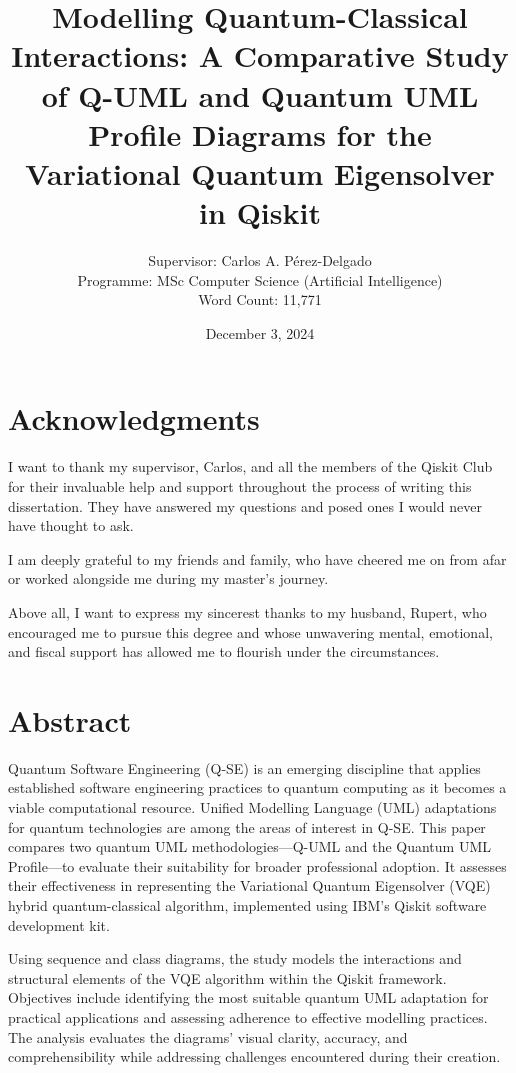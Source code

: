 \documentclass{article}
\title{Modelling Quantum-Classical Interactions: A Comparative Study of Q-UML and Quantum UML Profile Diagrams for the Variational Quantum Eigensolver in Qiskit}
\author{Supervisor: Carlos A. Pérez-Delgado\\ Programme: MSc Computer Science (Artificial Intelligence) \\ Word Count: 11,771}
\date{December 3, 2024}
\begin{document}
\maketitle

\thispagestyle{empty} %

\newpage
\setcounter{page}{1}

\section*{Acknowledgments}

I want to thank my supervisor, Carlos, and all the members of the Qiskit Club for their invaluable help and support throughout the process of writing this dissertation. They have answered my questions and posed ones I would never have thought to ask.

I am deeply grateful to my friends and family, who have cheered me on from afar or worked alongside me during my master’s journey.

Above all, I want to express my sincerest thanks to my husband, Rupert, who encouraged me to pursue this degree and whose unwavering mental, emotional, and fiscal support has allowed me to flourish under the circumstances.

\newpage

\section*{Abstract}

Quantum Software Engineering (Q-SE) is an emerging discipline that applies established software engineering practices to quantum computing as it becomes a viable computational resource. Unified Modelling Language (UML) adaptations for quantum technologies are among the areas of interest in Q-SE. This paper compares two quantum UML methodologies—Q-UML and the Quantum UML Profile—to evaluate their suitability for broader professional adoption. It assesses their effectiveness in representing the Variational Quantum Eigensolver (VQE) hybrid quantum-classical algorithm, implemented using IBM’s Qiskit software development kit.

Using sequence and class diagrams, the study models the interactions and structural elements of the VQE algorithm within the Qiskit framework. Objectives include identifying the most suitable quantum UML adaptation for practical applications and assessing adherence to effective modelling practices. The analysis evaluates the diagrams' visual clarity, accuracy, and comprehensibility while addressing challenges encountered during their creation.
\end{document}

